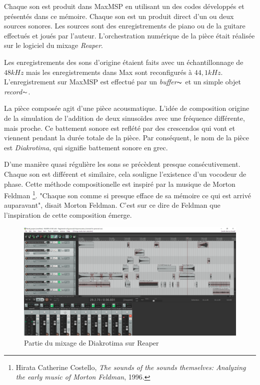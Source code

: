 Chaque son est produit dans MaxMSP en utilisant un des codes développés et présentés dans ce mémoire. Chaque son est un produit direct d'un ou deux sources sonores. Les sources sont des enregistrements de piano ou de la guitare effectués et joués par l'auteur. L'orchestration numérique de la pièce était réalisée sur le logiciel du mixage \textit{Reaper}. 

Les enregistrements des sons d'origine étaient faits avec un échantillonnage de $48kHz$ mais les enregistrements dans Max sont reconfigurés à $44,1kHz$. L'enregistrement sur MaxMSP est effectué par un \textit{buffer$\thicksim$} et un simple objet \textit{record$\thicksim$}. 

La pièce composée agit d'une pièce acousmatique. L'idée de composition origine de la simulation de l'addition de deux sinusoïdes avec une fréquence différente, mais proche. Ce battement sonore est reflété par des crescendos qui vont et viennent pendant la durée totale de la pièce. Par conséquent, le nom de la pièce est \textit{Diakrotima}, qui signifie battement sonore en grec.

D'une manière quasi régulière les sons se précèdent presque consécutivement. Chaque son est différent et similaire, cela souligne l'existence d'un vocodeur de phase. Cette méthode compositionelle est inspiré par la musique de Morton Feldman \footnote{Hirata Catherine Costello, \textit{The sounds of the sounds themselves: Analyzing the early music of Morton Feldman}, 1996. \nocite{hirata1996sounds}}. "Chaque son comme si presque efface de sa mémoire ce qui est arrivé auparavant", disait Morton Feldman. C'est sur ce dire de Feldman que l'inspiration de cette composition émerge.

    \begin{figure}
        \centering
        \includegraphics[width = \textwidth ]{Graphs/Reaper_capture_project.png}
        \caption{Partie du mixage de Diakrotima sur Reaper}
        \label{Reaper_capture}
    \end{figure} 

